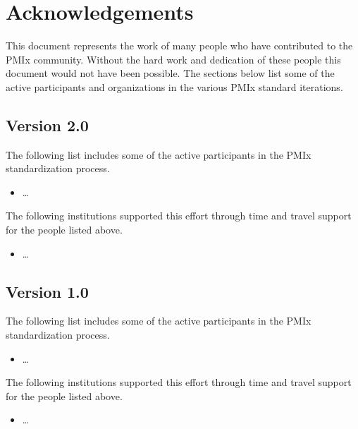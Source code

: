 \chapter{Acknowledgements}
\label{chap:acknowledgements}

This document represents the work of many people who have contributed to the PMIx community.
Without the hard work and dedication of these people this document would not have been possible.
The sections below list some of the active participants and organizations in the various PMIx standard iterations.

\section{Version 2.0}

The following list includes some of the active participants in the PMIx standardization process.

\begin{itemize}
\item \ldots
\end{itemize}

The following institutions supported this effort through time and travel support for the people listed above.

\begin{itemize}
\item \ldots
\end{itemize}


\section{Version 1.0}

The following list includes some of the active participants in the PMIx standardization process.

\begin{itemize}
\item \ldots
\end{itemize}

The following institutions supported this effort through time and travel support for the people listed above.

\begin{itemize}
\item \ldots
\end{itemize}
